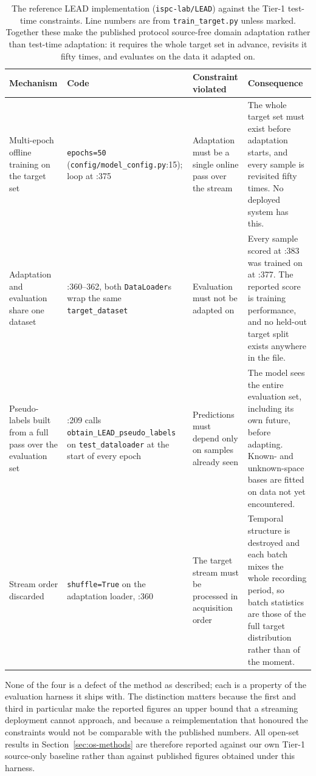 \begin{table}[t]
\centering
\caption{The reference LEAD implementation (\texttt{ispc-lab/LEAD}) against the Tier-1
test-time constraints. Line numbers are from \texttt{train\_target.py} unless marked.
Together these make the published protocol source-free domain adaptation rather than
test-time adaptation: it requires the whole target set in advance, revisits it fifty
times, and evaluates on the data it adapted on.}
\label{tab:leadviol}
\footnotesize
\setlength{\tabcolsep}{4pt}
\begin{tabular}{@{}>{\raggedright\arraybackslash}p{}%
                  >{\raggedright\arraybackslash}p{}%
                  >{\raggedright\arraybackslash}p{}%
                  >{\raggedright\arraybackslash}p{}@{}}
\toprule
Mechanism & Code & Constraint violated & Consequence \\
\midrule
Multi-epoch offline training on the target set
 & \texttt{epochs=50} (\texttt{config/\allowbreak model\_config.py}:15); loop at :375
 & Adaptation must be a single online pass over the stream
 & The whole target set must exist before adaptation starts, and every sample is revisited
   fifty times. No deployed system has this. \\
\addlinespace[3pt]
Adaptation and evaluation share one dataset
 & :360--362, both \texttt{DataLoader}s wrap the same \texttt{target\_dataset}
 & Evaluation must not be adapted on
 & Every sample scored at :383 was trained on at :377. The reported score is training
   performance, and no held-out target split exists anywhere in the file. \\
\addlinespace[3pt]
Pseudo-labels built from a full pass over the evaluation set
 & :209 calls \texttt{obtain\_LEAD\_\allowbreak pseudo\_labels} on \texttt{test\_dataloader} at the
   start of every epoch
 & Predictions must depend only on samples already seen
 & The model sees the entire evaluation set, including its own future, before adapting.
   Known- and unknown-space bases are fitted on data not yet encountered. \\
\addlinespace[3pt]
Stream order discarded
 & \texttt{shuffle=True} on the adaptation loader, :360
 & The target stream must be processed in acquisition order
 & Temporal structure is destroyed and each batch mixes the whole recording period, so
   batch statistics are those of the full target distribution rather than of the moment. \\
\bottomrule
\end{tabular}
\end{table}

None of the four is a defect of the method as described; each is a property of the
evaluation harness it ships with. The distinction matters because the first and third in
particular make the reported figures an upper bound that a streaming deployment cannot
approach, and because a reimplementation that honoured the constraints would not be
comparable with the published numbers. All open-set results in
Section~\ref{sec:os-methods} are therefore reported against our own Tier-1 source-only
baseline rather than against published figures obtained under this harness.
